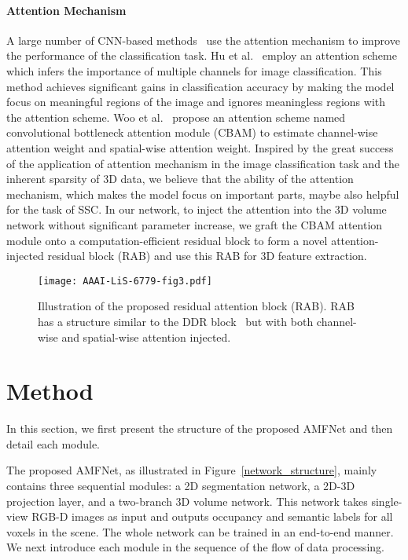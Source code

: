 \documentclass[letterpaper]{article} \usepackage{aaai20}  \usepackage{times}  \usepackage{helvet} \usepackage{courier}  \usepackage[hyphens]{url}  \usepackage{graphicx} \urlstyle{rm} \def\UrlFont{\rm}  \usepackage{graphicx}  \frenchspacing  \setlength{\pdfpagewidth}{8.5in}  \setlength{\pdfpageheight}{11in}
\begin{document}
\paragraph{Attention Mechanism}
A large number of CNN-based methods~\cite{Wang2017ResidualAN,Hu2017SqueezeandExcitationN} use the attention mechanism to improve the performance of the classification task. Hu et al.~\cite{Hu2017SqueezeandExcitationN} employ an attention scheme which infers the importance of multiple channels for image classification. This method achieves significant gains in classification accuracy by making the model focus on meaningful regions of the image and ignores meaningless regions with the attention scheme. Woo et al.~\cite{Woo2018CBAMCB} propose an attention scheme named convolutional bottleneck attention module (CBAM) to estimate channel-wise attention weight and spatial-wise attention weight. Inspired by the great success of the application of attention mechanism in the image classification task and the inherent sparsity of 3D data, we believe that the ability of the attention mechanism, which makes the model focus on important parts, maybe also helpful for the task of SSC. In our network, to inject the attention into the 3D volume network without significant parameter increase, we graft the CBAM attention module onto a computation-efficient residual block to form a novel attention-injected residual block (RAB) and use this RAB for 3D feature extraction. 

\begin{figure}[t]
\centering
\texttt{[image: AAAI-LiS-6779-fig3.pdf]}
\caption{Illustration of the proposed residual attention block (RAB). RAB has a structure similar to the DDR block~\cite{Li2019RGBDBD} but with both channel-wise and spatial-wise attention injected. 
}
\label{RAB_visualization}
\end{figure}


\section{Method}
In this section, we first present the structure of the proposed AMFNet and then detail each module. 
 
The proposed AMFNet, as illustrated in Figure~\ref{network_structure}, mainly contains three sequential modules: a 2D segmentation network, a 2D-3D projection layer, and a two-branch 3D volume network. This network takes single-view RGB-D images as input and outputs occupancy and semantic labels for all voxels in the scene. The whole network can be trained in an end-to-end manner. We next introduce each module in the sequence of the flow of data processing.
\end{document}
